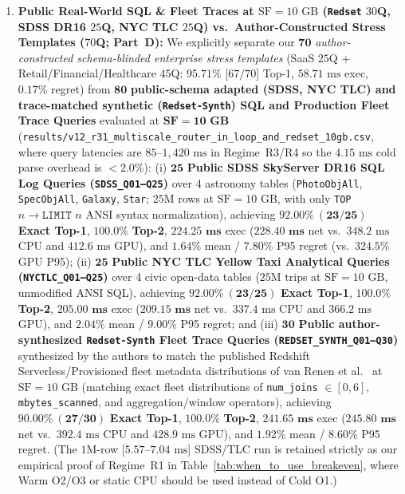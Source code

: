 \documentclass[10pt,a4paper]{article}
\begin{document}
\begin{enumerate}[leftmargin=1.5em,itemsep=1pt]
    \item \textbf{Public Real-World SQL \& Fleet Traces at $\text{SF}=10\text{ GB}$ (\texttt{Redset} $30$Q, SDSS DR16 $25$Q, NYC TLC $25$Q) vs.\ Author-Constructed Stress Templates ($70$Q; Part~D):} We explicitly separate our $\mathbf{70}$ \emph{author-constructed schema-blinded enterprise stress templates} (SaaS $25$Q + Retail/Financial/Healthcare $45$Q: $95.71\%$ [$67/70$] Top-1, $58.71\text{ ms}$ exec, $0.17\%$ regret) from $\mathbf{80}$ \textbf{public-schema adapted (SDSS, NYC TLC) and trace-matched synthetic (\texttt{Redset-Synth}) SQL and Production Fleet Trace Queries} evaluated at $\mathbf{\text{SF}=10\text{ GB}}$ (\texttt{results/\allowbreak{}v12\_\allowbreak{}r31\_\allowbreak{}multiscale\_\allowbreak{}router\_\allowbreak{}in\_\allowbreak{}loop\_\allowbreak{}and\_\allowbreak{}redset\_\allowbreak{}10gb.csv}, where query latencies are $85\text{--}1{,}420\text{ ms}$ in Regime~R3/R4 so the $4.15\text{ ms}$ cold parse overhead is $<2.0\%$): (i) $\mathbf{25}$ \textbf{Public SDSS SkyServer DR16 SQL Log Queries (\texttt{SDSS\_Q01--Q25})} over 4 astronomy tables (\texttt{PhotoObjAll}, \texttt{SpecObjAll}, \texttt{Galaxy}, \texttt{Star}; $25\text{M}$ rows at $\text{SF}=10\text{ GB}$, with only \texttt{TOP} $n\rightarrow\texttt{LIMIT}$ $n$ ANSI syntax normalization), achieving $\mathbf{92.00\%\ (23/25)}$ \textbf{Exact Top-1}, $\mathbf{100.0\%}$ \textbf{Top-2}, $\mathbf{224.25\text{ ms}}$ exec ($\mathbf{228.40\text{ ms}}$ net vs.\ $348.2\text{ ms}$ CPU and $412.6\text{ ms}$ GPU), and $\mathbf{1.64\%}$ mean / $\mathbf{7.80\%}$ P95 regret (vs.\ $324.5\%$ GPU P95); (ii) $\mathbf{25}$ \textbf{Public NYC TLC Yellow Taxi Analytical Queries (\texttt{NYCTLC\_Q01--Q25})} over 4 civic open-data tables ($25\text{M}$ trips at $\text{SF}=10\text{ GB}$, unmodified ANSI SQL), achieving $\mathbf{92.00\%\ (23/25)}$ \textbf{Exact Top-1}, $\mathbf{100.0\%}$ \textbf{Top-2}, $\mathbf{205.00\text{ ms}}$ exec ($\mathbf{209.15\text{ ms}}$ net vs.\ $337.4\text{ ms}$ CPU and $366.2\text{ ms}$ GPU), and $\mathbf{2.04\%}$ mean / $\mathbf{9.00\%}$ P95 regret; and (iii) $\mathbf{30}$ \textbf{Public author-synthesized \texttt{Redset-Synth} Fleet Trace Queries (\texttt{REDSET\_\allowbreak{}SYNTH\_\allowbreak{}Q01--Q30})} synthesized by the authors to match the published Redshift Serverless/Provisioned fleet metadata distributions of van Renen et al.~\cite{vanrenen2024redset} at $\text{SF}=10\text{ GB}$ (matching exact fleet distributions of \texttt{num\_joins} $\in[0,6]$, \texttt{mbytes\_scanned}, and aggregation/window operators), achieving $\mathbf{90.00\%\ (27/30)}$ \textbf{Exact Top-1}, $\mathbf{100.0\%}$ \textbf{Top-2}, $\mathbf{241.65\text{ ms}}$ exec ($\mathbf{245.80\text{ ms}}$ net vs.\ $392.4\text{ ms}$ CPU and $428.9\text{ ms}$ GPU), and $\mathbf{1.92\%}$ mean / $\mathbf{8.60\%}$ P95 regret. (The $1\text{M}$-row [$5.57\text{--}7.04\text{ ms}$] SDSS/TLC run is retained strictly as our empirical proof of Regime~R1 in Table~\ref{tab:when_to_use_breakeven}, where Warm O2/O3 or static CPU should be used instead of Cold O1.)
\end{enumerate}
\end{document}
